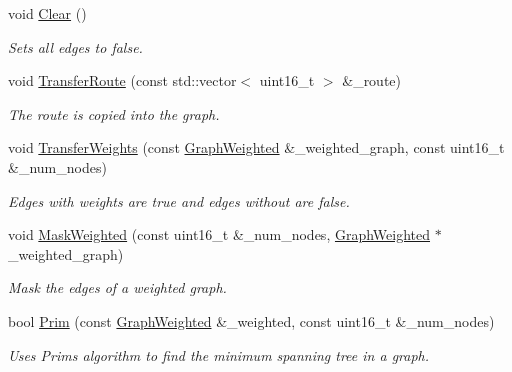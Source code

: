 \begin{DoxyCompactItemize}
\mbox{\label{classosse_1_1collaborate_1_1_graph_unweighted_a9fe20052aa221d26ecd27db25c0c9391}} 
void \hyperlink{classosse_1_1collaborate_1_1_graph_unweighted_a9fe20052aa221d26ecd27db25c0c9391}{Clear} ()
\begin{DoxyCompactList}\small\item\em Sets all edges to false. \end{DoxyCompactList}\item 
void \hyperlink{classosse_1_1collaborate_1_1_graph_unweighted_ab38de4495671d90fe49aae2b5be2500b}{Transfer\+Route} (const std\+::vector$<$ uint16\+\_\+t $>$ \&\+\_\+route)
\begin{DoxyCompactList}\small\item\em The route is copied into the graph. \end{DoxyCompactList}\item 
void \hyperlink{classosse_1_1collaborate_1_1_graph_unweighted_ada77cbd0724afefdb49d381d63fdda24}{Transfer\+Weights} (const \hyperlink{classosse_1_1collaborate_1_1_graph_weighted}{Graph\+Weighted} \&\+\_\+weighted\+\_\+graph, const uint16\+\_\+t \&\+\_\+num\+\_\+nodes)
\begin{DoxyCompactList}\small\item\em Edges with weights are true and edges without are false. \end{DoxyCompactList}\item 
void \hyperlink{classosse_1_1collaborate_1_1_graph_unweighted_aaaffd6846abfa88f54eaa10fd24dd571}{Mask\+Weighted} (const uint16\+\_\+t \&\+\_\+num\+\_\+nodes, \hyperlink{classosse_1_1collaborate_1_1_graph_weighted}{Graph\+Weighted} $\ast$\+\_\+weighted\+\_\+graph)
\begin{DoxyCompactList}\small\item\em Mask the edges of a weighted graph. \end{DoxyCompactList}\item 
bool \hyperlink{classosse_1_1collaborate_1_1_graph_unweighted_aa64af5c58b4f322987f9d01f13c6e2d5}{Prim} (const \hyperlink{classosse_1_1collaborate_1_1_graph_weighted}{Graph\+Weighted} \&\+\_\+weighted, const uint16\+\_\+t \&\+\_\+num\+\_\+nodes)
\begin{DoxyCompactList}\small\item\em Uses Prim\textquotesingle{}s algorithm to find the minimum spanning tree in a graph. \end{DoxyCompactList}\end{DoxyCompactItemize}
